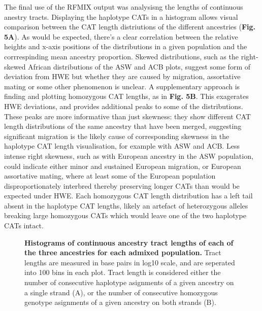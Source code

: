\documentclass[11pt]{article}
\begin{document}
The final use of the RFMIX output was analysisng the lengths of continuous anestry tracts. Displaying the haplotype CATs in a histogram allows visual comparison between the CAT length distriutions of the different ancestries (\textbf{Fig. 5A}). As would be expected, there's a clear correlation between the relative heights and x-axis positions of the distributions in a given population and the corrrespinding mean ancestry proportion. Skewed distributions, such as the right-skewed African distributions of the ASW and ACB plots, suggest some form of deviation from HWE but whether they are caused by migration, assortative mating or some other phenomenon is unclear.
A supplementary approach is finding and plotting homozygous CAT lengths, as in \textbf{Fig. 5B}. This exagerates HWE deviations, and provides additional peaks to some of the distributions. These peaks are more informative than just skewness: they show different CAT length distributions of the same ancestry that have been merged, suggesting significant migration is the likely cause of corresponding skewness in the haplotype CAT length visualisation, for example with ASW and ACB. Less intense right skewness, such as with European ancestry in the ASW population, could indicate either minor and sustained European migration, or European assortative mating, where at least some of the European population disproportionately interbred thereby preserving longer CATs than would be expected under HWE.
Each homozygous CAT length distribution has a left tail absent in the haplotype CAT lengths, likely an artefact of heterozygous alleles breaking large homozygous CATs which would leave one of the two haplotype CATs intact.








\begin{figure}[htb!]%
    \centering
    \vspace*{-1em}
    \vspace{.2cm}
    \caption{\textbf{
        Histograms of continuous ancestry tract lengths of each of the three ancestries for each admixed population.
    }
        Tract lengths are measured in base pairs in log10 scale, and are seperated into 100 bins in each plot. Tract length is considered either the number of consecutive haplotype asignments of a given ancestry on a single strand (A), or the number of consecutive homozygous genotype asignments of a given ancestry on both strands (B).
    }
\end{figure}
\end{document}
